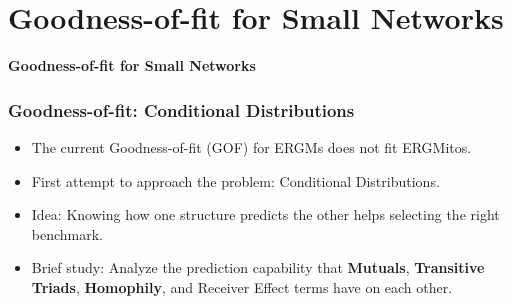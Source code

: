 \documentclass[aspectratio=169, 9pt]{beamer}
\begin{document}
\section{Goodness-of-fit for Small Networks}

\begin{frame}[c]
\textcolor{uscgold}{
\Large {\bf Goodness-of-fit for Small Networks}
}
\end{frame}



\begin{frame}
	\frametitle{Goodness-of-fit: Conditional Distributions}
	\begin{itemize}
		\item The current Goodness-of-fit (GOF) for ERGMs does not fit ERGMitos.\pause
		\item First attempt to approach the problem: Conditional Distributions.\pause
		\item Idea: Knowing how one structure predicts the other helps selecting the right benchmark.\pause
		\item Brief study: Analyze the prediction capability that \textbf{Mutuals}, \textbf{Transitive Triads}, \textbf{Homophily}, and Receiver Effect terms have on each other.
	\end{itemize}
	
\begin{figure}
	
	\centering
	\def\svgwidth{.6\linewidth}
	
	\label{fig:maxout-gof-chapter}
\end{figure}
\end{frame}
\end{document}
